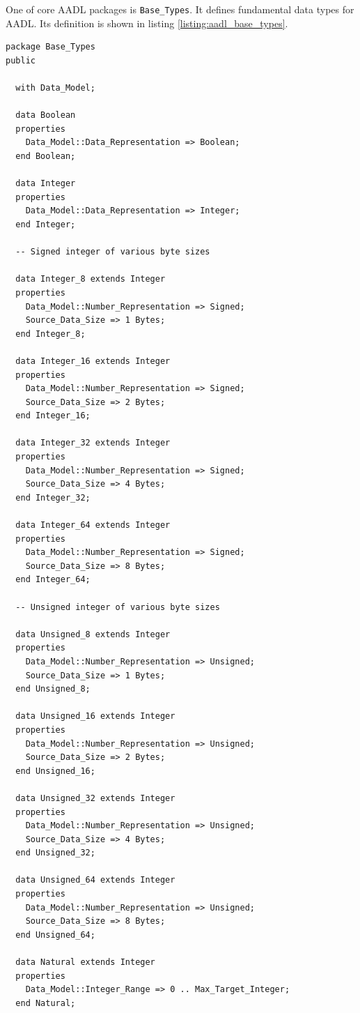 One of core AADL packages is \lstinline{Base_Types}. It defines fundamental data types for AADL. Its definition is shown in listing \ref{listing:aadl_base_types}.

\singlespacing
\begin{lstlisting}[language=aadl, frame=single, gobble=0, caption={AADL Base\_Types package}, label={listing:aadl_base_types}]
package Base_Types
public

  with Data_Model;

  data Boolean
  properties 
    Data_Model::Data_Representation => Boolean;
  end Boolean;

  data Integer
  properties
    Data_Model::Data_Representation => Integer;
  end Integer;

  -- Signed integer of various byte sizes

  data Integer_8 extends Integer
  properties
    Data_Model::Number_Representation => Signed;
    Source_Data_Size => 1 Bytes;
  end Integer_8;

  data Integer_16 extends Integer
  properties
    Data_Model::Number_Representation => Signed;
    Source_Data_Size => 2 Bytes;
  end Integer_16;

  data Integer_32 extends Integer
  properties
    Data_Model::Number_Representation => Signed;
    Source_Data_Size => 4 Bytes;
  end Integer_32;

  data Integer_64 extends Integer
  properties
    Data_Model::Number_Representation => Signed;
    Source_Data_Size => 8 Bytes;
  end Integer_64;

  -- Unsigned integer of various byte sizes

  data Unsigned_8 extends Integer
  properties
    Data_Model::Number_Representation => Unsigned;
    Source_Data_Size => 1 Bytes;
  end Unsigned_8;

  data Unsigned_16 extends Integer
  properties
    Data_Model::Number_Representation => Unsigned;
    Source_Data_Size => 2 Bytes;
  end Unsigned_16;

  data Unsigned_32 extends Integer
  properties
    Data_Model::Number_Representation => Unsigned;
    Source_Data_Size => 4 Bytes;
  end Unsigned_32;

  data Unsigned_64 extends Integer
  properties
    Data_Model::Number_Representation => Unsigned;
    Source_Data_Size => 8 Bytes;
  end Unsigned_64;

  data Natural extends Integer
  properties 
    Data_Model::Integer_Range => 0 .. Max_Target_Integer;
  end Natural;


\end{lstlisting}

